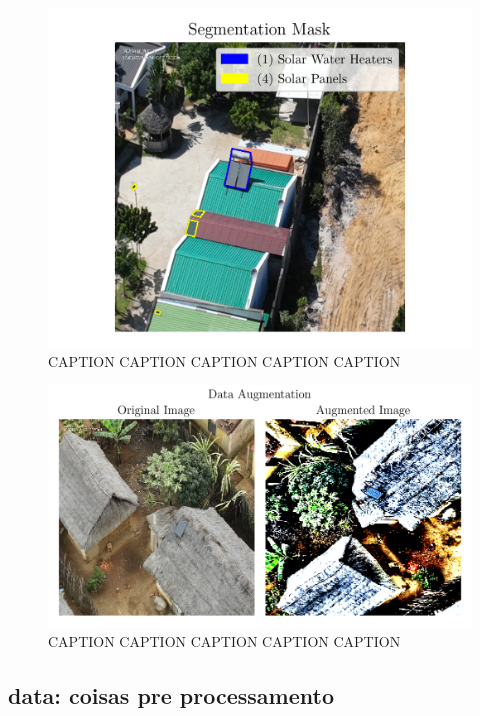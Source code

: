 \documentclass[conference]{IEEEtran}
\begin{document}
\begin{figure}[H]
    \centering
    \includegraphics[width=1\linewidth]{assets/data_segmentation_mask.png}
    \caption{CAPTION CAPTION CAPTION CAPTION CAPTION}
    \label{fig:data_segmentation_mask}
\end{figure}

\begin{figure}[H]
    \centering
    \includegraphics[width=1\linewidth]{assets/data_augmentation.png}
    \caption{CAPTION CAPTION CAPTION CAPTION CAPTION}
    \label{fig:data_augmentation}
\end{figure}

\subsection{data: coisas pre processamento}
\end{document}
